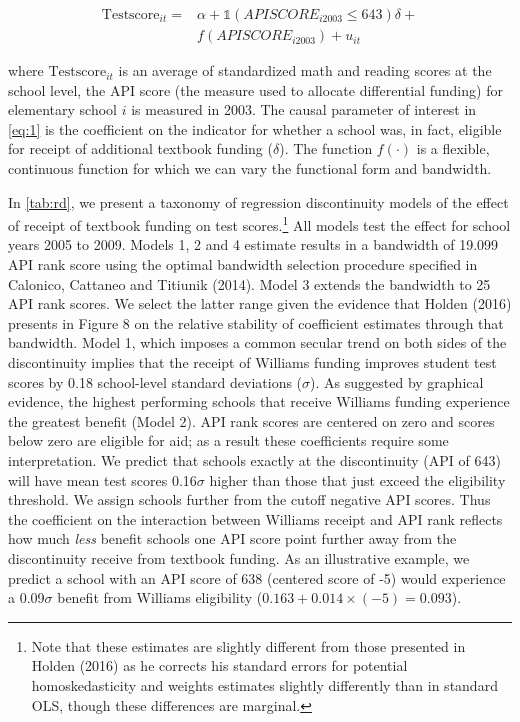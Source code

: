 \documentclass[a4paper, 11pt]{article}
\begin{document}
\begin{enumerate}
\begin{equation} 
\begin{aligned}
\text{Testscore}_{it}= & \alpha+ \mathbb{1} \left(APISCORE_{i2003} \leq 643\right)\delta + \\
& f\left(APISCORE_{i2003}\right)+u_{it}
\label{eq:1}
\end{aligned}
\end{equation}

	where $\text{Testscore}_{it}$ is an average of standardized math and reading scores at the school level, the API score (the measure used to allocate differential funding) for elementary school $i$ is measured in 2003. The causal parameter of interest in \autoref{eq:1} is the coefficient on the indicator for whether a school was, in fact, eligible for receipt of additional textbook funding ($\delta$). The function $f(\cdot)$ is a flexible, continuous function for which we can vary the functional form and bandwidth.


	In \autoref{tab:rd}, we present a taxonomy of regression discontinuity models of the effect of receipt of textbook funding on test scores.\footnote{Note that these estimates are slightly different from those presented in Holden (2016) as he corrects his standard errors for potential homoskedasticity and weights estimates slightly differently than in standard OLS, though these differences are marginal.}  All models test the effect for school years 2005 to 2009. Models 1, 2 and 4 estimate results in a bandwidth of 19.099 API rank score using the optimal bandwidth selection procedure specified in Calonico, Cattaneo and Titiunik (2014). Model 3 extends the bandwidth to 25 API rank scores. We select the latter range given the evidence that Holden (2016) presents in Figure 8 on the relative stability of coefficient estimates through that bandwidth. Model 1, which imposes a common secular trend on both sides of the discontinuity implies that the receipt of Williams funding improves student test scores by 0.18 school-level standard deviations ($\sigma$). As suggested by graphical evidence, the highest performing schools that receive Williams funding experience the greatest benefit (Model 2). API rank scores are centered on zero and scores below zero are eligible for aid; as a result these coefficients require some interpretation. We predict that schools exactly at the discontinuity (API of 643) will have mean test scores 0.16$\sigma$ higher than those that just exceed the eligibility threshold. We assign schools further from the cutoff negative API scores. Thus the coefficient on the interaction between Williams receipt and API rank reflects how much \textit{less} benefit schools one API score point further away from the discontinuity receive from textbook funding. As an illustrative example, we predict a school with an API score of 638 (centered score of -5) would experience a 0.09$\sigma$ benefit from Williams eligibility ($0.163+0.014 \times (-5)=0.093$).


\end{enumerate}
\end{document}

